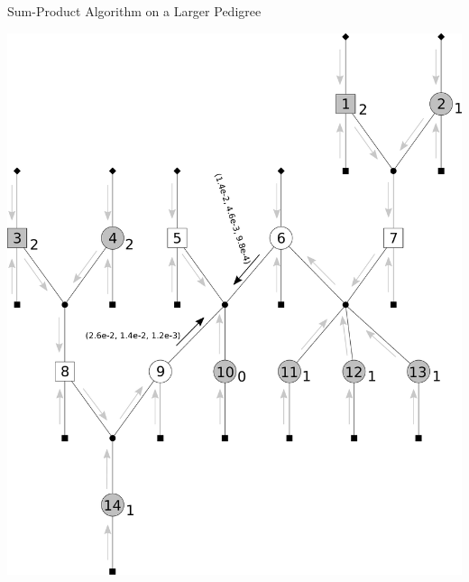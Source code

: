 \documentclass[letter,graphicx]{beamer}
\begin{document}
\begin{frame}{Sum-Product Algorithm on a Larger Pedigree} 
\begin{center} 
\includegraphics[height = 0.8\textheight]{./images/mg-example-step6.pdf} 
\end{center}
\end{frame}
\end{document}
